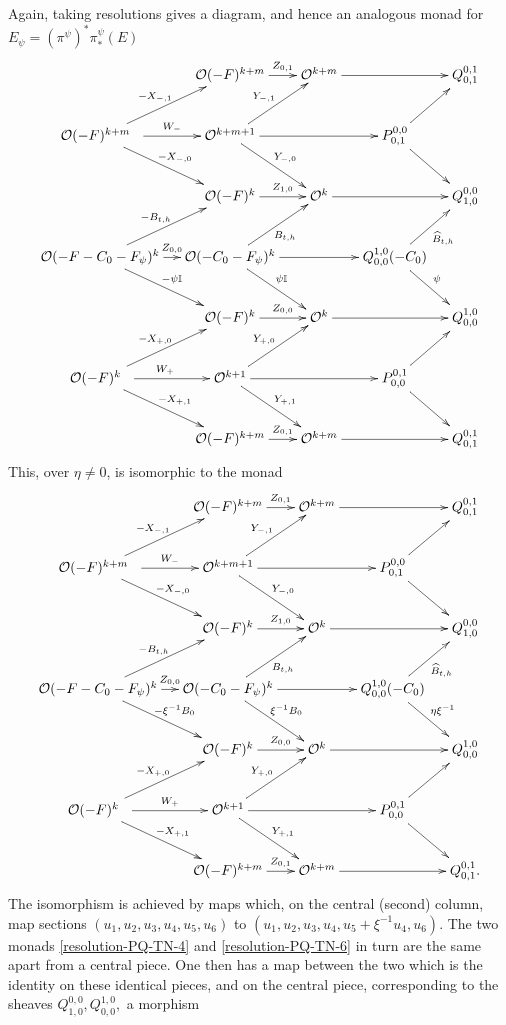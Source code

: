 \documentclass[12pt]{article}
\theoremstyle{definition}
\theoremstyle{remark}
\numberwithin{theorem}{section}
\def\bI{{\mathbb {I}}}
\def\pO{{\mathcal O}}
\begin{document}
Again, taking resolutions gives  a diagram, and hence an analogous monad for $E_\psi = (\pi^\psi)^*\pi^\psi_*(E)$
    \begin{equation} \label{resolution-PQ-TN-5}\xymatrix@C=1pc{  
 & \pO(-F)^{k+m} \ar[r]^-{Z_{ 0,1} } &\pO^{k+m}\ar[rr]& &Q_{0,1}^{0,1}\\
 \pO(-F)^{k+m}\ \  \ar[dr]^{-X_{-,0} }\ar[r]^-{W_{ -}}\ar[ur]^{-X_{-,1} }& \pO^{k+m+1} \ar[dr]^{Y_{ -,0} }\ar[ur]^{Y_{ -,1} }\ar[rr]&&P_{0,1}^{0,0} \ar[ur]\ar[dr] \\ 
 &  \pO(-F)^{k } \ar[r]^-{Z_{  1,0}} &\pO^{k}\ar[rr]& &Q_{ 1,0}^{0,0} \\ 
 \pO(-F-C_0-F_\psi)^{k}\ar[dr]^{-\psi\bI} \ar[ur]^{ -B_{t,h}}\ar[r]^-{Z_{0,0}} &  \pO(-C_0-F_\psi)^{k}\ar[dr]^{\psi\bI}  \ar[ru]_{ B_{t,h}} \ar[rr]& &Q^{ 1,0}_{0,0}(-C_0)\ar[dr]^\psi \ar[ru]_{\widehat B_{t,h}} \\
 & \pO(-F)^{k }\ar[r]^-{Z_{0,0}} &\pO^{k} \ar[rr]& &Q_{0 ,0}^{1,0} \\
 \pO(-F)^{k }\ \ \ar[dr]^{-X_{ +,1}  } \ar[r]^{W_{+}}\ar[ur]^{-X_{+,0} }&   \pO^{k+1}\ar[dr]^{Y_{+,1}}\ar[ur]^{Y_{+,0}}\ar[rr]& &P_{0,0}^{0,1}\ar[dr] \ar[ur]\\
 & \pO(-F)^{k+m} \ar[r]^-{Z_{ 0,1} } &\pO^{k+m}\ar[rr]& &Q_{0,1}^{0,1}\\
 }
\end{equation}
 This, over $\eta\neq 0$, is  isomorphic to the monad 
   \begin{equation} \label{resolution-PQ-TN-6}\xymatrix@C=1pc{  
 & \pO(-F)^{k+m} \ar[r]^-{Z_{ 0,1} } &\pO^{k+m}\ar[rr]& &Q_{0,1}^{0,1}\\
 \pO(-F)^{k+m}\ \  \ar[dr]^{-X_{-,0} }\ar[r]^-{W_{ -}}\ar[ur]^{-X_{-,1} }& \pO^{k+m+1} \ar[dr]^{Y_{ -,0} }\ar[ur]^{Y_{ -,1} }\ar[rr]& &P_{0,1}^{0,0} \ar[ur]\ar[dr] \\ 
 &  \pO(-F)^{k } \ar[r]^-{Z_{ 1,0}} &\pO^{k}\ar[rr]& &Q_{ 1,0}^{ 0,0} \\ 
 \pO(-F-C_0-F_\psi)^{k}\ar[dr]^{-\xi^{-1}B_0} \ar[ur]^{ -B_{t,h}}\ar[r]^-{Z_{0,0}} &  \pO(-C_0-F_\psi)^{k}\ar[dr]^{\xi^{-1}B_0}  \ar[ru]_{ B_{t,h}} \ar[rr]& &Q^{ 1,0}_{0,0}(-C_0) \ar[dr]^{ \eta \xi^{-1}} \ar[ru]_{\widehat B_{t,h}} \\
 & \pO(-F)^{k }\ar[r]^-{Z_{0,0}} &\pO^{k}\ar[rr]& &Q_{0 ,0}^{ 1,0} \\
 \pO(-F)^{k }\ \ \ar[dr]^{-X_{ +,1}  } \ar[r]^-{W_{+}}\ar[ur]^{-X_{+,0} }&   \pO^{k+1}\ar[dr]^{Y_{+,1}}\ar[ur]^{Y_{+,0}}\ar[rr]& &P_{0,0}^{0,1}\ar[dr] \ar[ur]\\
 & \pO(-F)^{k+m} \ar[r]^-{Z_{0,1} } &\pO^{k+m}\ar[rr]& &Q_{0,1}^{0,1}.
 }
\end{equation}
The isomorphism is achieved by maps which, on the central (second) column, map 
sections $(u_1, u_2, u_3, u_4,u_5, u_6)$ to $(u_1, u_2, u_3, u_4,u_5 +\xi^{-1} u_4, u_6)$.
The two monads \eqref {resolution-PQ-TN-4} and \eqref{resolution-PQ-TN-6} in turn are the same apart from a central piece. One then has a map between the two which is the identity   on these identical pieces, and on the central piece, corresponding to the sheaves $Q_{ 1,0}^{0,0} ,Q_{0,0}^{ 1,0},$  a morphism
\end{document}
